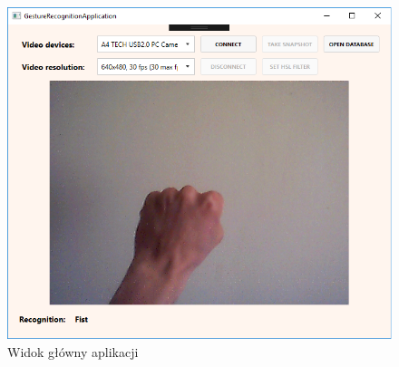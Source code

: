 \begin{figure}[h!]
	\centering
	\includegraphics[width=12cm]{MainWindow}
	\centering
	\caption{Widok główny aplikacji}
	\label{im: MainWindow}
\end{figure}

